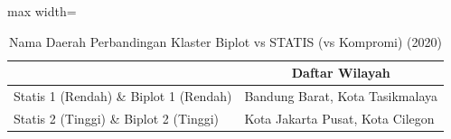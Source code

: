 \begin{table}[H]
\centering
\caption{Nama Daerah Perbandingan Klaster Biplot vs STATIS (vs Kompromi) (2020)} \label{tab:sample2biplot_statis_name_2020}
\begin{adjustbox}{max width=\textwidth}
\begin{tabular}{|>{\centering\arraybackslash}p{4cm}|p{10cm}|}
\hline
\multicolumn{1}{|c|}{\textbf{Kategori}} & \multicolumn{1}{c|}{\textbf{Daftar Wilayah}} \\
\hline
Statis 1 (Rendah) \& Biplot 1 (Rendah) & Bandung Barat, Kota Tasikmalaya \\
\hline
Statis 2 (Tinggi) \& Biplot 2 (Tinggi) & Kota Jakarta Pusat, Kota Cilegon \\
\hline
\end{tabular}
\end{adjustbox}
\end{table}